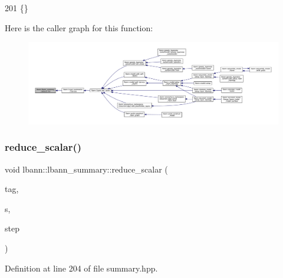 \begin{DoxyCode}
201 \{\}
\end{DoxyCode}
Here is the caller graph for this function\+:\nopagebreak
\begin{figure}[H]
\begin{center}
\leavevmode
\includegraphics[width=350pt]{classlbann_1_1lbann__summary_afbf2df538879fcc4ea90a2bc6a6c2974_icgraph}
\end{center}
\end{figure}
\mbox{\label{classlbann_1_1lbann__summary_a3e0b9aae1f80403a195567fd25ea2525}} 
\subsubsection{\texorpdfstring{reduce\+\_\+scalar()}{reduce\_scalar()}}
{\footnotesize\ttfamily void lbann\+::lbann\+\_\+summary\+::reduce\+\_\+scalar (\begin{DoxyParamCaption}\item[{const std\+::string}]{tag,  }\item[{Data\+Type}]{s,  }\item[{int}]{step }\end{DoxyParamCaption})\hspace{0.3cm}{\ttfamily [inline]}}



Definition at line 204 of file summary.\+hpp.


